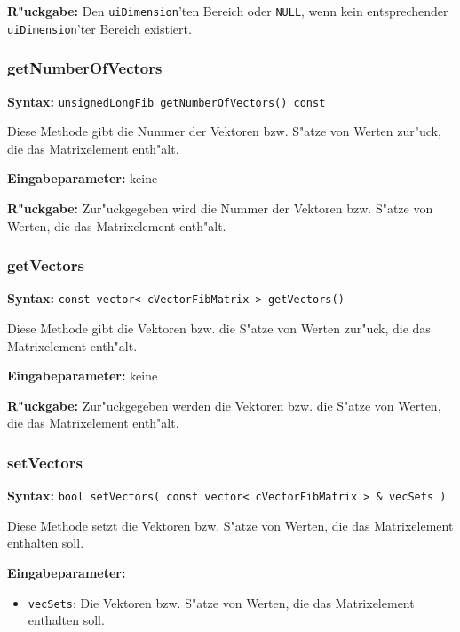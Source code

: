 \bigskip\noindent
\textbf{R"uckgabe:} Den \verb|uiDimension|'ten Bereich oder \verb|NULL|, wenn kein entsprechender \verb|uiDimension|'ter Bereich existiert.


\subsubsection{getNumberOfVectors}

\textbf{Syntax:} \verb|unsignedLongFib getNumberOfVectors() const|

\bigskip\noindent
Diese Methode gibt die Nummer der Vektoren bzw. S"atze von Werten zur"uck, die das Matrixelement enth"alt.

\bigskip\noindent
\textbf{Eingabeparameter:} keine

\bigskip\noindent
\textbf{R"uckgabe:} Zur"uckgegeben wird die Nummer der Vektoren bzw. S"atze von Werten, die das Matrixelement enth"alt.


\subsubsection{getVectors}

\textbf{Syntax:} \verb|const vector< cVectorFibMatrix > getVectors()|

\bigskip\noindent
Diese Methode gibt die Vektoren bzw. die S"atze von Werten zur"uck, die das Matrixelement enth"alt.

\bigskip\noindent
\textbf{Eingabeparameter:} keine

\bigskip\noindent
\textbf{R"uckgabe:} Zur"uckgegeben werden die Vektoren bzw. die S"atze von Werten, die das Matrixelement enth"alt.


\subsubsection{setVectors}

\textbf{Syntax:} \verb|bool setVectors( const vector< cVectorFibMatrix > & vecSets )|

\bigskip\noindent
Diese Methode setzt die Vektoren bzw. S"atze von Werten, die das Matrixelement enthalten soll.

\bigskip\noindent
\textbf{Eingabeparameter:}
\begin{itemize}
 \item \verb|vecSets|: Die Vektoren bzw. S"atze von Werten, die das Matrixelement enthalten soll.
\end{itemize}

